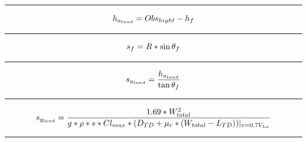\documentclass[12pt,A4paper]{article}
\begin{document}
		\hrule
		\vspace{0.1 in}
		\begin{equation}
			h_{a_{land}} = Obs_{hight} - h_f\\
		\end{equation}
		\hrule
		\vspace{0.1 in}
		\begin{equation}
			s_f = R * \sin{\theta_f}\\
		\end{equation}
		\hrule
		\vspace{0.1 in}
		\begin{equation}
			s_{a_{land}} = \frac{h_{a_{land}}}{\tan{\theta_f}}\\
		\end{equation}
		\hrule
		\vspace{0.1 in}
		\begin{equation}
			s_{g_{land}} = \frac{1.69*W_{total}^2}{g*\rho*s*Cl_{max}*(D_{TD} + \mu_r * (W_{total} - L_{TD}))|_{v= 0.7V_{Lo}}}\\
		\end{equation}
		\hrule
		\vspace{0.1 in}

	\normalsize
	
	\clearpage
\end{document}
